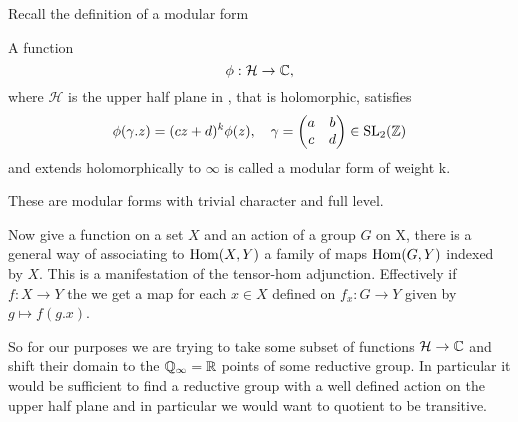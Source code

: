 	Recall the definition of a modular form 
	\begin{Definition}
		A function
		\[\phi: \mathcal{H} \to \C,\]
		where \(\mathcal{H}\) is the upper half plane in \C, that is holomorphic, satisfies 
		\[\phi(\gamma.z) = (cz+d)^k\phi(z), \quad \gamma = \begin{pmatrix}
			a &b \\
			c &d
		\end{pmatrix}\in \SL_2(\Z)\]
		and extends holomorphically to \(\infty\) is called a modular form of weight k.
	\end{Definition}
	These are modular forms with trivial character and full level.


	Now give a function on a set \(X\) and an action of a group \(G\) on X, there is a general way of associating to \(\operatorname{Hom}(X, Y)\) a family of maps \(\operatorname{Hom}(G, Y)\) indexed by \(X\). This is a manifestation of the tensor-hom adjunction. Effectively if \(f: X\to Y\) the we get a map for each \(x\in X\) defined on \(f_x : G \to Y\) given by \(g\mapsto f(g.x)\).

	So for our purposes we are trying to take some subset of functions \(\mathcal{H} \to \C\) and shift their domain to the \(\Q_\infty = \R\) points of some reductive group. In particular it would be sufficient to find a reductive group with a well defined action on the upper half plane and in particular we would want to quotient to be transitive.

